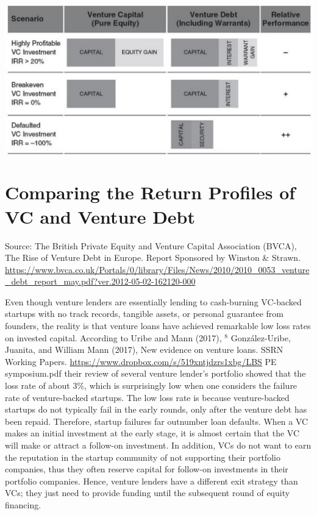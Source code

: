 \documentclass[11pt]{article}
\begin{document}
\begin{center}
\includegraphics[max width=\textwidth]{2024_04_10_cdc3d7c1e12c48419e6bg-5}
\end{center}

\section*{Comparing the Return Profiles of VC and Venture Debt}
Source: The British Private Equity and Venture Capital Association (BVCA), The Rise of Venture Debt in Europe. Report Sponsored by Winston \& Strawn. \href{https://www.bvca.co.uk/Portals/0/library/Files/News/2010/2010_0053_venture_debt_report_may.pdf?ver.2012-05-02-162120-000}{https://www.bvca.co.uk/Portals/0/library/Files/News/2010/2010\_0053\_venture\_debt\_report\_may.pdf?ver.2012-05-02-162120-000}

Even though venture lenders are essentially lending to cash-burning VC-backed startups with no track records, tangible assets, or personal guarantee from founders, the reality is that venture loans have achieved remarkable low loss rates on invested capital. According to Uribe and Mann (2017), ${ }^{8}$ González-Uribe, Juanita, and William Mann (2017), New evidence on venture loans. SSRN Working Papers. \href{https://www.dropbox.com/s/519xntjdzrs1xbg/LBS}{https://www.dropbox.com/s/519xntjdzrs1xbg/LBS} PE symposium.pdf their review of several venture lender's portfolio showed that the loss rate of about $3 \%$, which is surprisingly low when one considers the failure rate of venture-backed startups. The low loss rate is because venture-backed startups do not typically fail in the early rounds, only after the venture debt has been repaid. Therefore, startup failures far outnumber loan defaults. When a VC makes an initial investment at the early stage, it is almost certain that the VC will make or attract a follow-on investment. In addition, VCs do not want to earn the reputation in the startup community of not supporting their portfolio companies, thus they often reserve capital for follow-on investments in their portfolio companies. Hence, venture lenders have a different exit strategy than VCs; they just need to provide funding until the subsequent round of equity financing.
\end{document}
